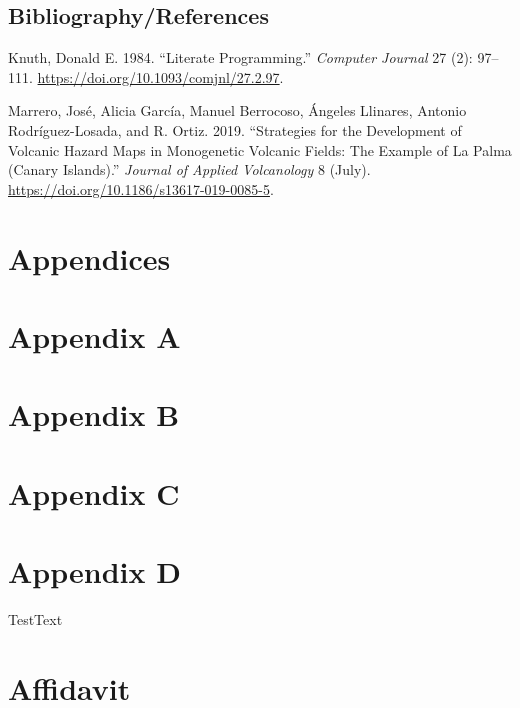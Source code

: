 \documentclass[11pt,a4paper]{report}
\begin{document}
\subsection*{Bibliography/References}\label{bibliographyreferences}

\label{refs}
\begin{CSLReferences}{1}{0}
Knuth, Donald E. 1984. {``Literate Programming.''} \emph{Computer
Journal} 27 (2): 97--111. \url{https://doi.org/10.1093/comjnl/27.2.97}.

Marrero, José, Alicia García, Manuel Berrocoso, Ángeles Llinares,
Antonio Rodríguez-Losada, and R. Ortiz. 2019. {``Strategies for the
Development of Volcanic Hazard Maps in Monogenetic Volcanic Fields: The
Example of {La Palma} ({Canary Islands}).''} \emph{Journal of Applied
Volcanology} 8 (July). \url{https://doi.org/10.1186/s13617-019-0085-5}.

\end{CSLReferences}

\section{Appendices}\label{appendices}

\section{Appendix A}\label{appendix-a}

\section{Appendix B}\label{appendix-b}

\section{Appendix C}\label{appendix-c}

\section{Appendix D}\label{appendix-d}

TestText

\section{Affidavit}\label{affidavit}
\end{document}
